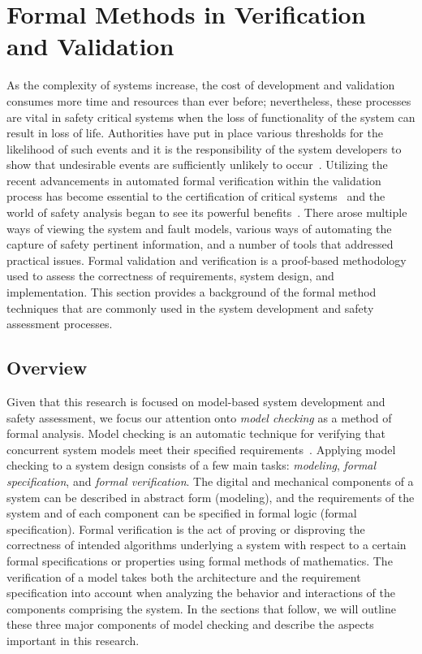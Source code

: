 \section{Formal Methods in Verification and Validation}
\label{sec:fm}
As the complexity of systems increase, the cost of development and validation consumes more time and resources than ever before; nevertheless, these processes are vital in safety critical systems when the loss of functionality of the system can result in loss of life. Authorities have put in place various thresholds for the likelihood of such events and it is the responsibility of the system developers to show that undesirable events are sufficiently unlikely to occur~\cite{faaSA}. Utilizing the recent advancements in automated formal verification within the validation process has become essential to the certification of critical systems~\cite{deptOfDefense,standard1999,prasad2005survey} and the world of safety analysis began to see its powerful benefits~\cite{hinchey2012industrial, liggesmeyer1998improving, coudert1993fault, Bozzano:2010:DSA:1951720,bozzano2003esacs}. There arose multiple ways of viewing the system and fault models, various ways of automating the capture of safety pertinent information, and a number of tools that addressed practical issues. Formal validation and verification is a proof-based methodology used to assess the correctness of requirements, system design, and implementation. This section provides a background of the formal method techniques that are commonly used in the system development and safety assessment processes.

\subsection{Overview}
Given that this research is focused on model-based system development and safety assessment, we focus our attention onto \emph{model checking} as a method of formal analysis. Model checking is an automatic technique for verifying that concurrent system models meet their specified requirements~\cite{clarke2018model}.  Applying model checking to a system design consists of a few main tasks: \emph{modeling}, \emph{formal specification}, and \emph{formal verification}. The digital and mechanical components of a system can be described in abstract form (modeling), and the requirements of the system and of each component can be specified in formal logic (formal specification). Formal verification is the act of proving or disproving the correctness of intended algorithms underlying a system with respect to a certain formal specifications or properties using formal methods of mathematics. The verification of a model takes both the architecture and the requirement specification into account when analyzing the behavior and interactions of the components comprising the system. In the sections that follow, we will outline these three major components of model checking and describe the aspects important in this research.

